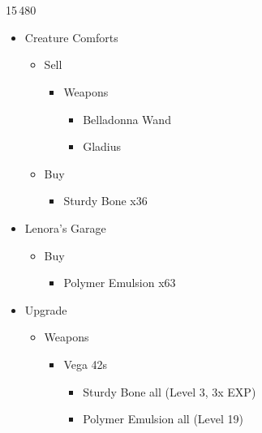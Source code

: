 \chapter[Chapter 6]{}


\begin{shop}{15\,480}
\begin{multicols}{2}
\begin{itemize}
    \item Creature Comforts
    \begin{itemize}
        \item Sell
        \begin{itemize}
            \item Weapons
            \begin{itemize}
                \item Belladonna Wand
                \item Gladius
            \end{itemize}
        \end{itemize}
        \item Buy
        \begin{itemize}
            \item Sturdy Bone x36
        \end{itemize}
    \end{itemize}
    \columnbreak
    \item Lenora's Garage
    \begin{itemize}
        \item Buy
        \begin{itemize}
            \item Polymer Emulsion x63
        \end{itemize}
    \end{itemize}
\end{itemize}
\end{multicols}
\end{shop}

\begin{upgrade}
\begin{itemize}
    \item Upgrade
    \begin{itemize}
        \item Weapons
        \begin{itemize}
            \item Vega 42s
            \begin{itemize}
                \item Sturdy Bone all (Level 3, 3x EXP)
                \item Polymer Emulsion all (Level 19)
            \end{itemize}
        \end{itemize}
    \end{itemize}
\end{itemize}
\end{upgrade}

